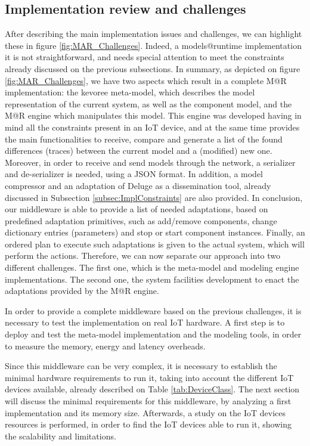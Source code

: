 \subsection{Implementation review and challenges}
\label{subsec:implReview}
After describing the main implementation issues and challenges, we can highlight these in figure \ref{fig:MAR_Challenges}.
Indeed, a models@runtime implementation it is not straightforward, and needs special attention to meet the constraints already discussed on the previous subsections.
In summary, as depicted on figure \ref{fig:MAR_Challenges}, we have two aspects which result in a complete M@R implementation: the kevoree meta-model, which describes the model representation of the current system, as well as the component model, and the M@R engine which manipulates this model.
This engine was developed having in mind all the constraints present in an IoT device, and at the same time provides the main functionalities to receive, compare and generate a list of the found differences (traces) between the current model and a (modified) new one.
Moreover, in order to receive and send models through the network, a serializer and de-serializer is needed, using a JSON format.
In addition, a model compressor and an adaptation of Deluge as a dissemination tool, already discussed in Subsection \ref{subsec:ImplConstraints} are also provided.
In conclusion, our middleware is able to provide a list of needed adaptations, based on predefined adaptation primitives, such as add/remove components, change dictionary entries (parameters) and stop or start component instances.
Finally, an ordered plan to execute such adaptations is given to the actual system, which will perform the actions.
Therefore, we can now separate our approach into two different challenges.
The first one, which is the meta-model and modeling engine implementations.
The second one, the system facilities development to enact the adaptations provided by the M@R engine.

In order to provide a complete middleware based on the previous challenges, it is necessary to test the implementation on real IoT hardware.
A first step is to deploy and test the meta-model implementation and the modeling tools, in order to measure the memory, energy and latency overheads.

Since this middleware can be very complex, it is necessary to establish the minimal hardware requirements to run it, taking into account the different IoT devices available, already described on Table \ref{tab:DeviceClass}.
The next section will discuss the minimal requirements for this middleware, by analyzing a first implementation and its memory size.
Afterwards, a study on the IoT devices resources is performed, in order to find the IoT devices able to run it, showing the scalability and limitations.

